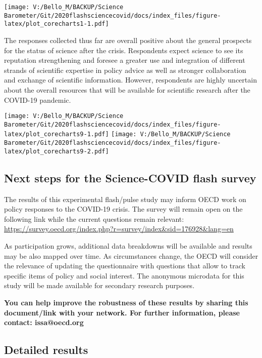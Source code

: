 \documentclass[
]{article}
\begin{document}
\texttt{[image: V:/Bello\_M/BACKUP/Science Barometer/Git/2020flashsciencecovid/docs/index\_files/figure-latex/plot\_corecharts1-1.pdf]}

The responses collected thus far are overall positive about the general
prospects for the status of science after the crisis. Respondents expect
science to see its reputation strengthening and foresee a greater use
and integration of different strands of scientific expertise in policy
advice as well as stronger collaboration and exchange of scientific
information. However, respondents are highly uncertain about the overall
resources that will be available for scientific research after the
COVID-19 pandemic.

\texttt{[image: V:/Bello\_M/BACKUP/Science Barometer/Git/2020flashsciencecovid/docs/index\_files/figure-latex/plot\_corecharts9-1.pdf]}
\texttt{[image: V:/Bello\_M/BACKUP/Science Barometer/Git/2020flashsciencecovid/docs/index\_files/figure-latex/plot\_corecharts9-2.pdf]}

\hypertarget{next-steps-for-the-science-covid-flash-survey}{%
\subsection{\texorpdfstring{\textbf{Next steps for the Science-COVID
flash
survey}}{Next steps for the Science-COVID flash survey}}\label{next-steps-for-the-science-covid-flash-survey}}

The results of this experimental flash/pulse study may inform OECD work
on policy responses to the COVID-19 crisis. The survey will remain open
on the following link while the current questions remain relevant:
\url{https://survey.oecd.org/index.php?r=survey/index\&sid=176928\&lang=en}

As participation grows, additional data breakdowns will be available and
results may be also mapped over time. As circumstances change, the OECD
will consider the relevance of updating the questionnaire with questions
that allow to track specific items of policy and social interest. The
anonymous microdata for this study will be made available for secondary
research purposes.

\textbf{You can help improve the robustness of these results by sharing
this document/link with your network. For further information, please
contact: issa@oecd.org }

\hypertarget{detailed-results}{%
\subsection{\texorpdfstring{\textbf{Detailed
results}}{Detailed results}}\label{detailed-results}}
\end{document}
